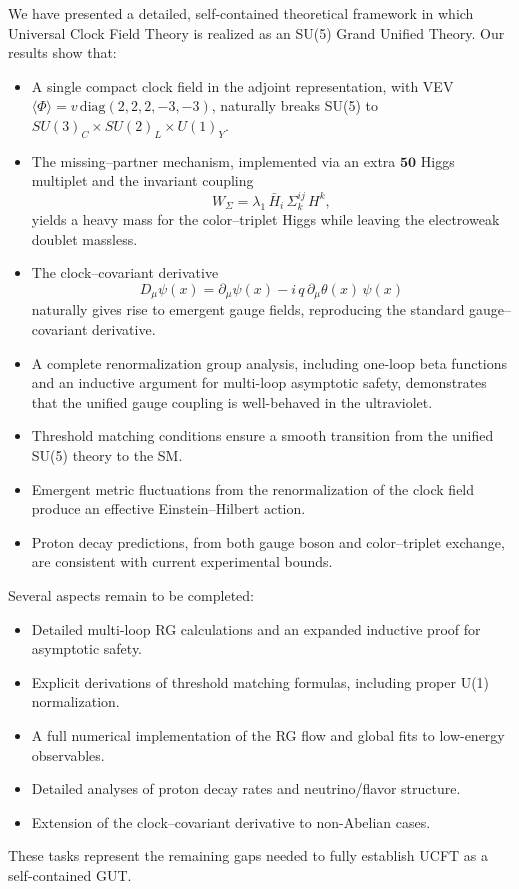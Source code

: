 \documentclass[aps,prd,preprint,groupedaddress]{revtex4-2}
\begin{document}
We have presented a detailed, self-contained theoretical framework in which Universal Clock Field Theory is realized as an SU(5) Grand Unified Theory. Our results show that:
\begin{itemize}
    \item A single compact clock field in the adjoint representation, with VEV $\langle \Phi\rangle = v\,\mathrm{diag}(2,2,2,-3,-3)$, naturally breaks SU(5) to $SU(3)_C\times SU(2)_L\times U(1)_Y$.
    \item The missing–partner mechanism, implemented via an extra $\mathbf{50}$ Higgs multiplet and the invariant coupling 
    \[
    W_{\Sigma}=\lambda_1\,\bar{H}_i\,\Sigma^{ij}_k\,H^k,
    \]
    yields a heavy mass for the color–triplet Higgs while leaving the electroweak doublet massless.
    \item The clock–covariant derivative
    \[
    D_\mu\psi(x)=\partial_\mu\psi(x)-i\,q\,\partial_\mu\theta(x)\,\psi(x)
    \]
    naturally gives rise to emergent gauge fields, reproducing the standard gauge–covariant derivative.
    \item A complete renormalization group analysis, including one-loop beta functions and an inductive argument for multi-loop asymptotic safety, demonstrates that the unified gauge coupling is well-behaved in the ultraviolet.
    \item Threshold matching conditions ensure a smooth transition from the unified SU(5) theory to the SM.
    \item Emergent metric fluctuations from the renormalization of the clock field produce an effective Einstein--Hilbert action.
    \item Proton decay predictions, from both gauge boson and color–triplet exchange, are consistent with current experimental bounds.
\end{itemize}
Several aspects remain to be completed:
\begin{itemize}
    \item Detailed multi-loop RG calculations and an expanded inductive proof for asymptotic safety.
    \item Explicit derivations of threshold matching formulas, including proper U(1) normalization.
    \item A full numerical implementation of the RG flow and global fits to low-energy observables.
    \item Detailed analyses of proton decay rates and neutrino/flavor structure.
    \item Extension of the clock–covariant derivative to non-Abelian cases.
\end{itemize}
These tasks represent the remaining gaps needed to fully establish UCFT as a self-contained GUT.
\end{document}
